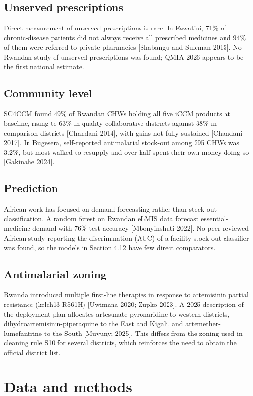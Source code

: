 \documentclass[10pt,a4paper]{article}
\begin{document}
\subsection{Unserved prescriptions}
Direct measurement of unserved prescriptions is rare. In Eswatini, 71\% of chronic-disease patients did not always receive all prescribed medicines and 94\% of them were referred to private pharmacies [Shabangu and Suleman 2015]. No Rwandan study of unserved prescriptions was found; QMIA 2026 appears to be the first national estimate.

\subsection{Community level}
SC4CCM found 49\% of Rwandan CHWs holding all five iCCM products at baseline, rising to 63\% in quality-collaborative districts against 38\% in comparison districts [Chandani 2014], with gains not fully sustained [Chandani 2017]. In Bugesera, self-reported antimalarial stock-out among 295 CHWs was 3.2\%, but most walked to resupply and over half spent their own money doing so [Gakinahe 2024].

\subsection{Prediction}
African work has focused on demand forecasting rather than stock-out classification. A random forest on Rwandan eLMIS data forecast essential-medicine demand with 76\% test accuracy [Mbonyinshuti 2022]. No peer-reviewed African study reporting the discrimination (AUC) of a facility stock-out classifier was found, so the models in Section 4.12 have few direct comparators.

\subsection{Antimalarial zoning}
Rwanda introduced multiple first-line therapies in response to artemisinin partial resistance (kelch13 R561H) [Uwimana 2020; Zupko 2023]. A 2025 description of the deployment plan allocates artesunate-pyronaridine to western districts, dihydroartemisinin-piperaquine to the East and Kigali, and artemether-lumefantrine to the South [Muvunyi 2025]. This differs from the zoning used in cleaning rule S10 for several districts, which reinforces the need to obtain the official district list.

\section{Data and methods}
\end{document}
